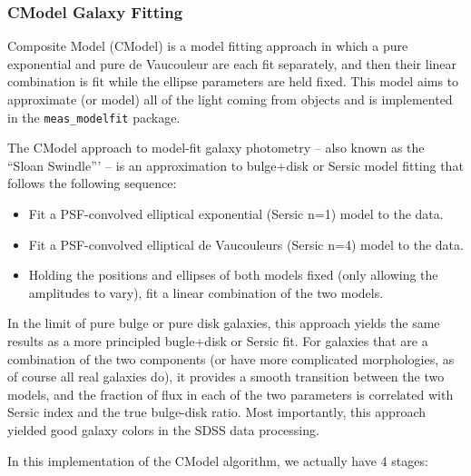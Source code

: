 \subsubsection{CModel Galaxy Fitting}
\label{sec:cmodel}

Composite Model (CModel) is a model fitting approach in which a pure exponential and pure de Vaucouleur are each fit separately, and then their linear combination is fit while the ellipse parameters are held fixed.
This model aims to approximate (or model) all of the light coming from objects and is implemented in the \texttt{meas\_modelfit} package.

The CModel approach to model-fit galaxy photometry -- also known as the ``Sloan Swindle''' -- is an approximation to bulge+disk or Sersic model fitting that follows the following sequence:

\begin{itemize}
\item Fit a PSF-convolved elliptical exponential (Sersic n=1) model to the data.
\item Fit a PSF-convolved elliptical de Vaucouleurs (Sersic n=4) model to the data.
\item  Holding the positions and ellipses of both models fixed (only allowing the amplitudes to vary),  fit a linear combination of the two models.
\end{itemize}

 In the limit of pure bulge or pure disk galaxies, this approach yields the same results as a more principled bugle+disk or Sersic fit.
 For galaxies that are a combination of the two components (or have more complicated morphologies, as of course all real galaxies do), it provides a smooth transition between the two models, and the fraction of flux in each of the two parameters is correlated with Sersic index and the true bulge-disk ratio.
 Most importantly, this approach yielded good galaxy colors in the SDSS data processing.

 In this implementation of the CModel algorithm, we actually have 4 stages:

